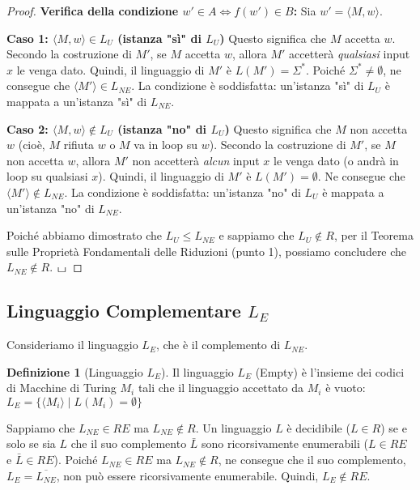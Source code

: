 \documentclass[a4paper]{article}
\newcommand{\blankS}{\ensuremath{\raisebox{-0.15ex}{\scalebox{1.3}[0.7]{$\sqcup$}}}}
\theoremstyle{definition} %
\newtheorem{definition}[theorem]{Definizione}
\begin{document}
\begin{proof}
\textbf{Verifica della condizione $w' \in A \iff f(w') \in B$:}
Sia $w' = \langle M, w \rangle$.

\textbf{Caso 1: $\langle M, w \rangle \in L_U$ (istanza "sì" di $L_U$)}
Questo significa che $M$ accetta $w$.
Secondo la costruzione di $M'$, se $M$ accetta $w$, allora $M'$ accetterà \emph{qualsiasi} input $x$ le venga dato.
Quindi, il linguaggio di $M'$ è $L(M') = \Sigma^*$.
Poiché $\Sigma^* \neq \emptyset$, ne consegue che $\langle M' \rangle \in L_{NE}$.
La condizione è soddisfatta: un'istanza "sì" di $L_U$ è mappata a un'istanza "sì" di $L_{NE}$.

\textbf{Caso 2: $\langle M, w \rangle \notin L_U$ (istanza "no" di $L_U$)}
Questo significa che $M$ non accetta $w$ (cioè, $M$ rifiuta $w$ o $M$ va in loop su $w$).
Secondo la costruzione di $M'$, se $M$ non accetta $w$, allora $M'$ non accetterà \emph{alcun} input $x$ le venga dato (o andrà in loop su qualsiasi $x$).
Quindi, il linguaggio di $M'$ è $L(M') = \emptyset$.
Ne consegue che $\langle M' \rangle \notin L_{NE}$.
La condizione è soddisfatta: un'istanza "no" di $L_U$ è mappata a un'istanza "no" di $L_{NE}$.

Poiché abbiamo dimostrato che $L_U \le L_{NE}$ e sappiamo che $L_U \notin R$, per il Teorema sulle Proprietà Fondamentali delle Riduzioni (punto 1), possiamo concludere che $L_{NE} \notin R$.
$\blankS$
\end{proof}

\subsection{Linguaggio Complementare $L_E$}

Consideriamo il linguaggio $L_E$, che è il complemento di $L_{NE}$.
\begin{definition}[Linguaggio $L_E$]
Il linguaggio $L_E$ (Empty) è l'insieme dei codici di Macchine di Turing $M_i$ tali che il linguaggio accettato da $M_i$ è vuoto:
$L_E = \{ \langle M_i \rangle \mid L(M_i) = \emptyset \}$
\end{definition}

Sappiamo che $L_{NE} \in RE$ ma $L_{NE} \notin R$.
Un linguaggio $L$ è decidibile ($L \in R$) se e solo se sia $L$ che il suo complemento $\bar{L}$ sono ricorsivamente enumerabili ($L \in RE$ e $\bar{L} \in RE$).
Poiché $L_{NE} \in RE$ ma $L_{NE} \notin R$, ne consegue che il suo complemento, $L_E = \overline{L_{NE}}$, non può essere ricorsivamente enumerabile.
Quindi, $L_E \notin RE$.
\end{document}
